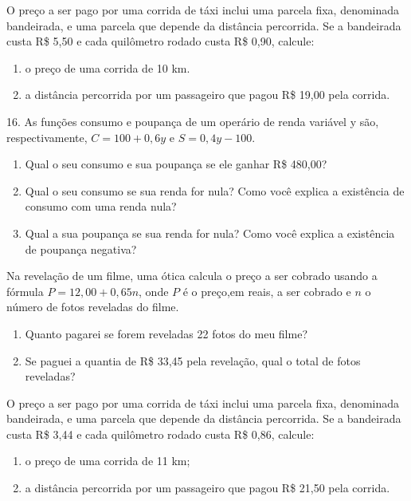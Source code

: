 				\item O preço a ser pago por uma corrida de táxi inclui uma parcela fixa, denominada bandeirada, e uma parcela que depende da distância percorrida. Se a bandeirada custa R\$ 5,50 e cada quilômetro rodado custa R\$ 0,90, calcule:

				\begin{enumerate}
					\item o preço de uma corrida de 10 km.
					\item a distância percorrida por um passageiro que pagou R\$ 19,00 pela corrida.	
				\end{enumerate}

16. As funções consumo e poupança de um operário de renda variável y são, respectivamente, $C = 100 + 0,6y$ e $S = 0,4y-100$.
				\begin{enumerate}
					\item Qual o seu consumo e sua poupança se ele ganhar R\$ 480,00?
					\item Qual o seu consumo se sua renda for nula? Como você explica a existência de consumo com uma renda nula?	
					\item Qual a sua poupança se sua renda for nula? Como você explica a existência de poupança negativa?
				\end{enumerate}

				\item Na revelação de um filme, uma ótica calcula o preço a ser cobrado usando a fórmula $P = 12,00 + 0,65n$, onde $P$ é o preço,em reais, a ser cobrado e $n$ o número de fotos reveladas do filme.
				\begin{enumerate}
					\item Quanto pagarei se forem reveladas 22 fotos do meu filme?
					\item Se paguei a quantia de R\$ 33,45 pela revelação, qual o total de fotos reveladas?
				\end{enumerate}


				\item O preço a ser pago por uma corrida de táxi inclui uma parcela fixa, denominada bandeirada, e uma parcela que depende da distância percorrida. Se a bandeirada custa R\$ 3,44 e cada quilômetro rodado custa R\$ 0,86, calcule:

				\begin{enumerate}
					\item o preço de uma corrida de 11 km;
					\item a distância percorrida por um passageiro que pagou R\$ 21,50 pela corrida.
				\end{enumerate}

